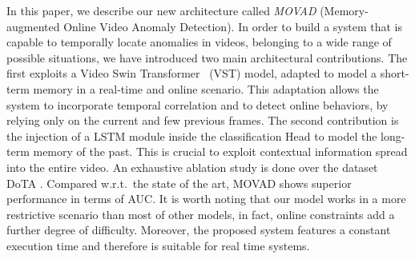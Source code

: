 In this paper, we describe our new architecture called \emph{MOVAD} (Memory-augmented Online Video Anomaly Detection).
In order to build a system that is capable to temporally locate anomalies in videos, belonging to a wide range of possible situations, we have introduced two main architectural contributions.
The first exploits a Video Swin Transformer~\cite{liu_video_2022} (VST) model, adapted to model a short-term memory in a real-time and online scenario.
This adaptation allows the system to incorporate temporal correlation and to detect online behaviors, by relying only on the current and few previous frames.
The second contribution is the injection of a LSTM module inside the classification Head to model the long-term memory of the past.
This is crucial to exploit contextual information spread into the entire video.
An exhaustive ablation study is done over the dataset DoTA \cite{9712446}.
Compared w.r.t.~the state of the art, MOVAD shows superior performance in terms of AUC.
It is worth noting that our model works in a more restrictive scenario than most of other models, in fact, online constraints add a further degree of difficulty. Moreover, the proposed system features a constant execution time and therefore is suitable for real time systems.